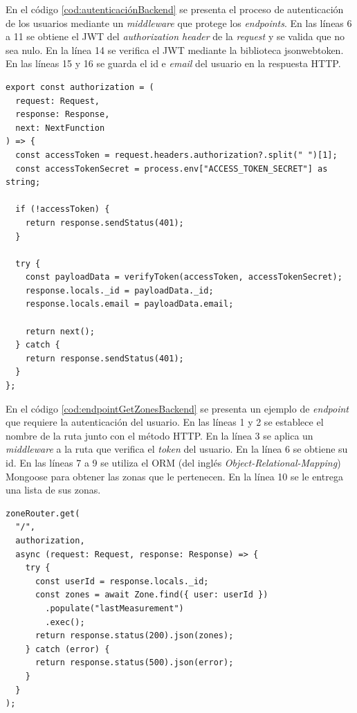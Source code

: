 En el código \ref{cod:autenticaciónBackend} se presenta el proceso de autenticación de los usuarios mediante un \emph{middleware} que protege los \emph{endpoints}. En las líneas 6 a 11 se obtiene el JWT del \textit{authorization header} \citep{WEBSITE:HTTPHEADERAUTHORIZATION} de la \emph{request} y se valida que no sea nulo. En la línea 14 se verifica el JWT mediante la biblioteca jsonwebtoken. En las líneas 15 y 16 se guarda el id e \textit{email} del usuario en la respuesta HTTP.

\begin{lstlisting}[label=cod:autenticaciónBackend,caption=Autenticación de usuarios mediante un \emph{middleware}.]
export const authorization = (
  request: Request,
  response: Response,
  next: NextFunction
) => {
  const accessToken = request.headers.authorization?.split(" ")[1];
  const accessTokenSecret = process.env["ACCESS_TOKEN_SECRET"] as string;

  if (!accessToken) {
    return response.sendStatus(401);
  }

  try {
    const payloadData = verifyToken(accessToken, accessTokenSecret);
    response.locals._id = payloadData._id;
    response.locals.email = payloadData.email;

    return next();
  } catch {
    return response.sendStatus(401);
  }
};
\end{lstlisting}

En el código \ref{cod:endpointGetZonesBackend} se presenta un ejemplo de \emph{endpoint} que requiere la autenticación del usuario. En las líneas 1 y 2 se establece el nombre de la ruta junto con el método HTTP. En la línea 3 se aplica un \emph{middleware} a la ruta que verifica el \emph{token} del usuario. En la línea 6 se obtiene su id. En las líneas 7 a 9 se utiliza el ORM (del inglés \textit{Object-Relational-Mapping}) Mongoose para obtener las zonas que le pertenecen. En la línea 10 se le entrega una lista de sus zonas.

\begin{lstlisting}[label=cod:endpointGetZonesBackend,caption=\emph{Endpoint} que requiere autenticación.]
zoneRouter.get(
  "/",
  authorization,
  async (request: Request, response: Response) => {
    try {
      const userId = response.locals._id;
      const zones = await Zone.find({ user: userId })
        .populate("lastMeasurement")
        .exec();
      return response.status(200).json(zones);
    } catch (error) {
      return response.status(500).json(error);
    }
  }
);
\end{lstlisting} 


